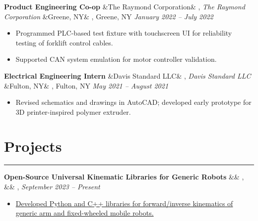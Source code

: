 \documentclass[letterpaper,10pt]{article}
\newcommand{\heading}[1]{%
    \vspace{-5mm} %
    \section*{#1}%
    \vspace{-3mm}%
    \noindent\hrule height 0.5pt %
    \vspace{4mm}%
}
\newcommand{\experience}[5]{%
    \vspace{-1mm}%
    \noindent\textbf{#1}%
    \ifx&#2&
    \else
        , \textit{#2}%
    \fi
    \ifx&#3&
    \else
        , #3%
    \fi
    \hfill \textit{#4} \\
    \vspace{-6.8mm}%
    \begin{itemize}[itemsep=-5pt]
        \setlength{\itemindent}{0em}
        #5
    \end{itemize}
}
\begin{document}
\experience
    {Product Engineering Co-op}
    {The Raymond Corporation}
    {Greene, NY}
    {January 2022 – July 2022}
    {
        \item Programmed PLC-based test fixture with touchscreen UI for reliability testing of forklift control cables.
        
        \item Supported CAN system emulation for motor controller validation.


    }

\experience
    {Electrical Engineering Intern}
    {Davis Standard LLC}
    {Fulton, NY}
    {May 2021 – August 2021}
    {
        \item Revised schematics and drawings in AutoCAD; developed early prototype for 3D printer-inspired polymer extruder.
        

    }
    


\vspace{-0.5em}
\heading{Projects}

    
\experience
    {Open-Source Universal Kinematic Libraries for Generic Robots}
    {}
    {}
    {September 2023 – Present}
    {
        \item \href{https://ryanbarry.me/projects/robotics/kinematics/}{Developed Python and C++ libraries for forward/inverse kinematics of generic arm and fixed-wheeled mobile robots.}
        
    }
    
\end{document}
